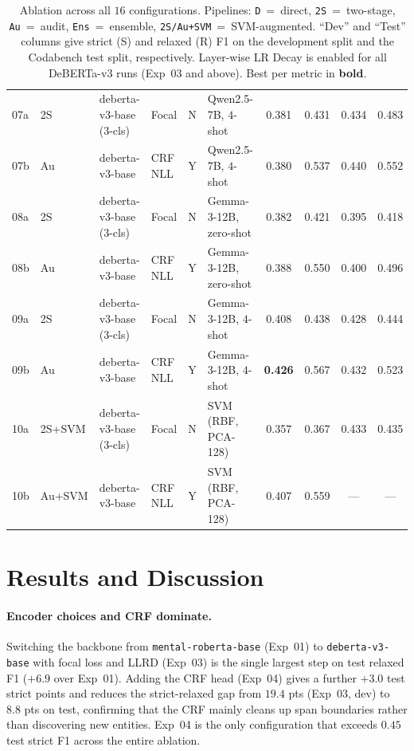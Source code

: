 \documentclass[11pt]{article}
\begin{document}
\begin{table}[!t]
\begin{tabular}{l l l l c l c c c c}
07a & 2S   & deberta-v3-base (3-cls)    & Focal   & N & Qwen2.5-7B, $4$-shot      & 0.381          & 0.431          & 0.434          & 0.483 \\
07b & Au   & deberta-v3-base            & CRF NLL & Y & Qwen2.5-7B, $4$-shot      & 0.380          & 0.537          & 0.440          & 0.552 \\
08a & 2S   & deberta-v3-base (3-cls)    & Focal   & N & Gemma-3-12B, zero-shot    & 0.382          & 0.421          & 0.395          & 0.418 \\
08b & Au   & deberta-v3-base            & CRF NLL & Y & Gemma-3-12B, zero-shot    & 0.388          & 0.550          & 0.400          & 0.496 \\
09a & 2S   & deberta-v3-base (3-cls)    & Focal   & N & Gemma-3-12B, $4$-shot     & 0.408          & 0.438          & 0.428          & 0.444 \\
09b & Au   & deberta-v3-base            & CRF NLL & Y & Gemma-3-12B, $4$-shot     & \textbf{0.426} & 0.567          & 0.432          & 0.523 \\
\midrule
10a & 2S+SVM & deberta-v3-base (3-cls)  & Focal   & N & SVM (RBF, PCA-128)        & 0.357          & 0.367          & 0.433          & 0.435 \\
10b & Au+SVM & deberta-v3-base          & CRF NLL & Y & SVM (RBF, PCA-128)        & 0.407          & 0.559          & ---            & ---   \\
\bottomrule
\end{tabular}
\caption{Ablation across all $16$ configurations. Pipelines:
\texttt{D}~=~direct, \texttt{2S}~=~two-stage, \texttt{Au}~=~audit,
\texttt{Ens}~=~ensemble, \texttt{2S/Au+SVM}~=~SVM-augmented. ``Dev''
and ``Test'' columns give strict (S) and relaxed (R) F1 on the
development split and the Codabench test split, respectively.
Layer-wise LR Decay is enabled for all DeBERTa-v3 runs (Exp~03 and
above). Best per metric in \textbf{bold}.}
\label{tab:ablation}
\end{table}

\section{Results and Discussion}
\label{sec:results}

\paragraph{Encoder choices and CRF dominate.} Switching the
backbone from \texttt{mental-roberta-base} (Exp~01) to
\texttt{deberta-v3-base} with focal loss and LLRD (Exp~03) is the
single largest step on test relaxed F1 ($+6.9$ over Exp~01).
Adding the CRF head (Exp~04) gives a further $+3.0$ test strict
points and reduces the strict-relaxed gap from $19.4$ pts (Exp~03,
dev) to $8.8$ pts on test, confirming that the CRF mainly cleans up
span boundaries rather than discovering new entities. Exp~04 is the
only configuration that exceeds $0.45$ test strict F1 across the
entire ablation.
\end{document}
